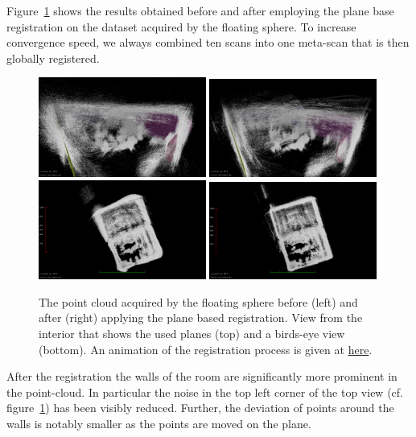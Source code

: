 Figure~\ref{fig:cylon-corrected} shows the results obtained before  and after employing the plane base registration on the dataset acquired by the floating sphere.
To increase convergence speed, we always combined ten scans into one meta-scan that is then globally registered. 
\begin{figure}
	\centering
	\includegraphics[width=0.49\textwidth]{./images/cylon_uncorr_corner}\hfill
	\includegraphics[width=0.49\textwidth]{./images/cylon_corr_corner}\\
	\includegraphics[width=0.49\textwidth]{./images/cylon_uncorr_top}\hfill
	\includegraphics[width=0.49\textwidth]{./images/cylon_corr_top}
	\caption{The point cloud acquired by the floating sphere before (left) and after (right) applying the plane based registration. View from the interior that shows the used planes (top) and a birds-eye view (bottom). An animation of the registration process is given at \href{https://youtu.be/8XdIUN_9VpY}{here}.}
	\label{fig:cylon-corrected}
\end{figure}
After the registration the walls of the room are significantly more prominent in the point-cloud. 
In particular the noise in the top left corner of the top view (cf. figure~\ref{fig:cylon-corrected}) has been visibly reduced.
Further, the deviation of points around the walls is notably smaller as the points are moved on the plane.

